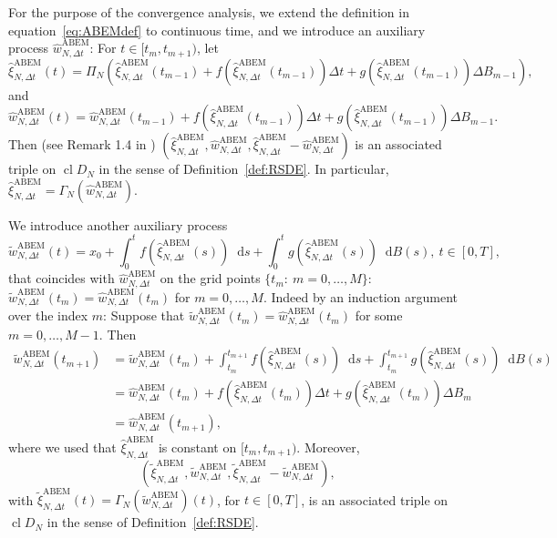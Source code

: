 \documentclass[11pt]{amsart}
\newcommand*\diff{\mathop{}\!\mathrm{d}}
\newcommand{\CDDN}{\operatorname{cl} D_{N}}
\newcommand{\xiNDt}{\hat{\xi}_{N,\Delta t}}
\newcommand{\txiNDt}{\tilde{\xi}_{N,\Delta t}}
\newcommand{\twNDt}{\tilde{w}_{N,\Delta t}}
\newcommand{\ABEM}{\textrm{ABEM}}
\begin{document}
{For the purpose of the convergence analysis, we extend the definition in equation~\eqref{eq:ABEMdef} to continuous time, and we introduce an auxiliary process $\hat{w}_{N,\Delta t}^{\ABEM}$:  For $t \in [t_{m},t_{m+1})$, let
\begin{equation}\label{eq:ABEMdefCont}
\hat{\xi}^{\ABEM}_{N,\Delta t}(t) = \Pi_{N} \left( \hat{\xi}^{\ABEM}_{N,\Delta t}(t_{m-1}) + f \left( \hat{\xi}^{\ABEM}_{N,\Delta t}(t_{m-1}) \right) \Delta t + g \left( \hat{\xi}^{\ABEM}_{N,\Delta t}(t_{m-1}) \right) \Delta B_{m-1} \right),
\end{equation}
and
\begin{equation*}
\hat{w}_{N,\Delta t}^{\ABEM}(t) = \hat{w}_{N,\Delta t}^{\ABEM}(t_{m-1}) + f \left( \hat{\xi}^{\ABEM}_{N,\Delta t}(t_{m-1}) \right) \Delta t + g \left( \hat{\xi}^{\ABEM}_{N,\Delta t}(t_{m-1}) \right) \Delta B_{m-1}.
\end{equation*}
Then (see Remark 1.4 in \cite{MR873889}) $(\xiNDt^{\ABEM},\hat{w}_{N,\Delta t}^{\ABEM},\xiNDt^{\ABEM}-\hat{w}_{N,\Delta t}^{\ABEM})$ is an associated triple on $\CDDN$  in the sense of Definition~\ref{def:RSDE}. In particular, $\hat{\xi}^{\ABEM}_{N,\Delta t} = \Gamma_{N}(\hat{w}_{N,\Delta t}^{\ABEM})$.

We introduce another auxiliary process
\begin{equation}\label{eq:deftwNDt}
\twNDt^{\ABEM}(t) = x_{0} + \int_{0}^{t} f(\xiNDt^{\ABEM}(s)) \diff s + \int_{0}^{t} g(\xiNDt^{\ABEM}(s)) \diff B(s),\ t \in [0,T],
\end{equation}
that coincides with $\hat{w}_{N,\Delta t}^{\ABEM}$ on the grid points $\{ t_{m}:\ m=0,\ldots,M \}$: $\twNDt^{\ABEM}(t_{m}) = \hat{w}_{N,\Delta t}^{\ABEM}(t_{m})$ for $m=0,\ldots,M$. Indeed by an induction argument over the index $m$: Suppose that $\twNDt^{\ABEM}(t_{m}) = \hat{w}_{N,\Delta t}^{\ABEM}(t_{m})$ for some $m=0,\ldots,M-1$. Then
\begin{align*}
\twNDt^{\ABEM}(t_{m+1}) &= \twNDt^{\ABEM}(t_{m}) + \int_{t_{m}}^{t_{m+1}} f(\xiNDt^{\ABEM}(s)) \diff s + \int_{t_{m}}^{t_{m+1}} g(\xiNDt^{\ABEM}(s)) \diff B(s) \\ &= \hat{w}_{N,\Delta t}^{\ABEM}(t_{m}) + f(\xiNDt^{\ABEM}(t_{m})) \Delta t + g(\xiNDt^{\ABEM}(t_{m})) \Delta B_{m} \\ &= \hat{w}_{N,\Delta t}^{\ABEM}(t_{m+1}),
\end{align*}
where we used that $\xiNDt^{\ABEM}$ is constant on $[t_{m},t_{m+1})$. Moreover, 
\begin{equation*}
(\txiNDt^{\ABEM},\twNDt^{\ABEM},\txiNDt^{\ABEM} - \twNDt^{\ABEM}),
\end{equation*}
with $\txiNDt^{\ABEM}(t) = \Gamma_{N}(\twNDt^{\ABEM})(t)$, for $t \in [0,T]$, is an associated triple on $\CDDN$ in the sense of Definition~\ref{def:RSDE}. 

}
\end{document}
